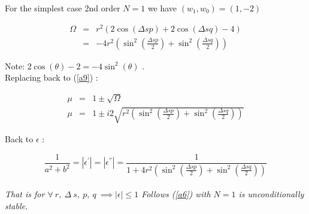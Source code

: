 \documentclass[legalpaper, 12pt]{article}
\begin{document}
For the simplest case 2nd order $ N=1 $ we have $ (w_1, w_0) = (1, -2) $

\begin{eqnarray}
\Omega	&=& r^2 \left( 2\cos(\Delta s p) + 2\cos(\Delta s q) - 4\right) \nonumber \\
	&=& -4r^2 \left( \sin^2(\frac{\Delta s p}{2}) + \sin^2(\frac{\Delta s q}{2}) \right) \label{a10}
\end{eqnarray}

Note:  $ 2 \cos(\theta) - 2 = -4 \sin ^2 (\theta) $ .\\

Replacing back to (\ref{a9}) :

\begin{eqnarray}
\mu &=& 1 \pm \sqrt{\Omega} \nonumber \\
\mu &=& 1 \pm  i 2 \sqrt{r^2 \left( \sin^2(\frac{\Delta s p}{2}) + \sin^2(\frac{\Delta s q}{2}) \right)} \nonumber
\end{eqnarray}

Back to $\epsilon$ :

$$ \frac{1}{a^2+b^2} = | \epsilon^{'} | = | \epsilon^{''} | = 
\frac{1}{1 + 4r^2 \left( \sin^2(\frac{\Delta s p}{2}) + \sin^2(\frac{\Delta s q}{2}) \right)} $$
\\
\textit{That is for $ \forall \ r, \ \Delta \ s, \ p, \ q \ \implies | \epsilon | \leq 1 $ 
Follows (\ref{a6}) with $N=1$ is unconditionally stable. }
\end{document}
